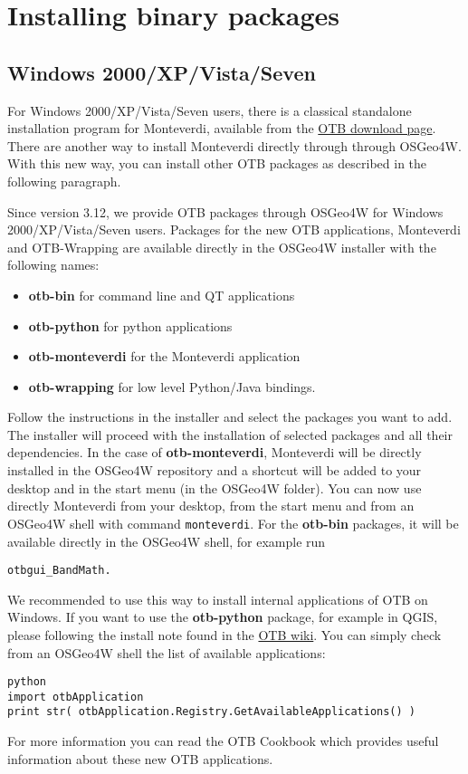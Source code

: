 \section{Installing binary packages}
\label{sec:install_binaries}

\subsection{Windows 2000/XP/Vista/Seven}
\label{ssec:windows_binaries}

For Windows 2000/XP/Vista/Seven users, there is a classical standalone installation program for Monteverdi, available from the 
\href{http://sourceforge.net/projects/orfeo-toolbox/}{OTB download page}. There are another way to install Monteverdi directly through through OSGeo4W. With this new way, you can install other OTB packages as described in the following paragraph. 

Since version 3.12, we provide OTB packages through OSGeo4W for Windows 2000/XP/Vista/Seven users. Packages for the new OTB applications, Monteverdi and 
OTB-Wrapping are available directly in the OSGeo4W installer with the following names:
\begin{itemize}
\item \textbf{otb-bin} for command line and QT applications
\item \textbf{otb-python} for python applications
\item \textbf{otb-monteverdi} for the Monteverdi application 
\item \textbf{otb-wrapping} for low level Python/Java bindings.
\end{itemize}
Follow the instructions in the installer and select the packages you want to add. The installer will proceed with the installation of selected packages and all their dependencies.
In the case of \textbf{otb-monteverdi}, Monteverdi will be directly installed in the OSGeo4W repository and a shortcut will be added to your desktop 
and in the start menu (in the OSGeo4W folder). You can now use directly Monteverdi from your desktop, from the start menu and from an OSGeo4W shell with command \texttt{monteverdi}. 
For the \textbf{otb-bin} packages, it will be available directly in the OSGeo4W shell, for example run 
\begin{verbatim}
otbgui_BandMath.
\end{verbatim}
 We recommended to use this way to install internal applications of OTB on Windows. 
If you want to use the \textbf{otb-python} package, for example in QGIS, please following the install note found in the \href{http://wiki.orfeo-toolbox.org/index.php/Quantum_GIS_access_to_OTB_applications#Notes_for_Windows_users}{OTB wiki}. You can simply check from an OSGeo4W shell the list of available applications:
\begin{verbatim}
python
import otbApplication
print str( otbApplication.Registry.GetAvailableApplications() )
\end{verbatim}
For more information you can read the OTB Cookbook which provides useful information about these new OTB applications. 

